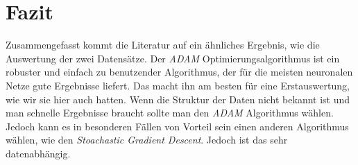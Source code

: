 \section{Fazit}\label{Fazit}

Zusammengefasst kommt die Literatur auf ein ähnliches Ergebnis, wie die Auswertung 
der zwei Datensätze. Der \textit{ADAM} Optimierungsalgorithmus ist ein robuster und 
einfach zu benutzender Algorithmus, der für die meisten neuronalen Netze gute Ergebnisse liefert. 
Das macht ihn am besten für eine Erstauswertung, wie wir sie hier auch hatten. 
Wenn die Struktur der Daten nicht bekannt ist und man schnelle Ergebnisse braucht 
sollte man den \textit{ADAM} Algorithmus wählen. Jedoch kann es in besonderen 
Fällen von Vorteil sein einen anderen Algorithmus wählen, wie den \textit{Stoachastic
Gradient Descent}. Jedoch ist das sehr datenabhängig.